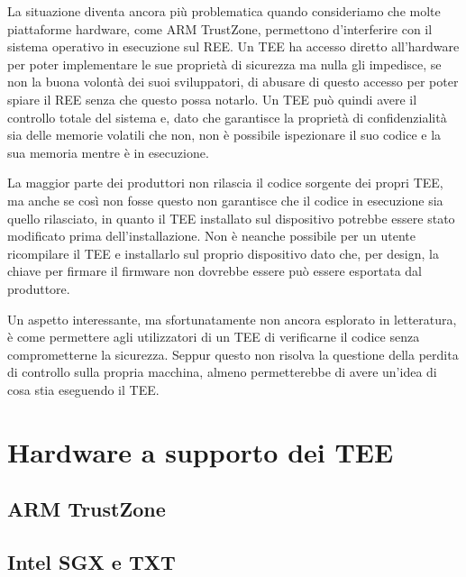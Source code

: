 \documentclass[12pt,italian]{report}
\begin{document}
La situazione diventa ancora più problematica quando consideriamo che
molte piattaforme hardware, come ARM TrustZone, permettono d'interferire
con il sistema operativo in esecuzione sul REE. %
Un TEE ha accesso diretto all'hardware per poter implementare le sue proprietà
di sicurezza ma nulla gli impedisce, se non la buona volontà dei suoi
sviluppatori, di abusare di questo accesso per poter spiare il REE senza che
questo possa notarlo.
Un TEE può quindi avere il controllo totale del sistema e, dato che garantisce
la proprietà di confidenzialità sia delle memorie volatili che non, non è
possibile ispezionare il suo codice e la sua memoria mentre è in esecuzione.

La maggior parte dei produttori non rilascia il codice sorgente dei propri TEE,
ma anche se così non fosse questo non garantisce che il codice in esecuzione
sia quello rilasciato, in quanto il TEE installato sul dispositivo potrebbe
essere stato modificato prima dell'installazione.
Non è neanche possibile per un utente ricompilare il TEE e installarlo
sul proprio dispositivo dato che, per design, la chiave per firmare il firmware
non dovrebbe essere può essere esportata dal produttore.

Un aspetto interessante, ma sfortunatamente non ancora esplorato in letteratura,
è come permettere agli utilizzatori di un TEE di verificarne il codice senza
comprometterne la sicurezza.
Seppur questo non risolva la questione della perdita di controllo sulla
propria macchina, almeno permetterebbe di avere un'idea di cosa stia eseguendo
il TEE.

\chapter{Hardware a supporto dei TEE}
\label{chap:hardware-supporto-tee}

\section{ARM TrustZone}
\label{sec:arm-trustzone}

\section{Intel SGX e TXT}
\label{sec:intel-sgx-txt}
\end{document}
